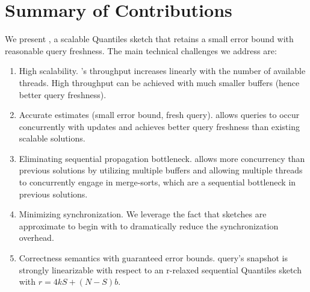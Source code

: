 \section{Summary of Contributions} 
We present \mysketch, a scalable Quantiles sketch that retains a small error bound with reasonable query freshness. The main technical challenges we address are:
\begin{enumerate}
  \item High scalability. \mysketch's throughput increases linearly with the number of available threads. High throughput can be achieved with much smaller buffers (hence better query freshness).
  \item Accurate estimates (small error bound, fresh query). \mysketch allows queries to occur concurrently with updates and achieves better query freshness than existing scalable solutions. 
  \item Eliminating sequential propagation bottleneck. \mysketch allows more concurrency than previous solutions by utilizing multiple buffers and allowing multiple threads to concurrently engage in merge-sorts, which are a sequential bottleneck in previous solutions. 
  \item Minimizing synchronization. We leverage the fact that sketches are approximate to begin with to dramatically reduce the synchronization overhead.
  \item Correctness semantics with guaranteed error bounds. \mysketch query's snapshot is strongly linearizable with respect to an r-relaxed sequential Quantiles sketch with \(r=4kS + (N-S)b\).
\end{enumerate}


